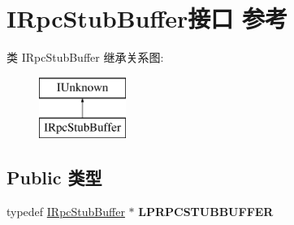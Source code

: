 \hypertarget{interface_i_rpc_stub_buffer}{}\section{I\+Rpc\+Stub\+Buffer接口 参考}
\label{interface_i_rpc_stub_buffer}
类 I\+Rpc\+Stub\+Buffer 继承关系图\+:\begin{figure}[H]
\begin{center}
\leavevmode
\includegraphics[height=2.000000cm]{interface_i_rpc_stub_buffer}
\end{center}
\end{figure}
\subsection*{Public 类型}
\begin{DoxyCompactItemize}
\item 
\mbox{\label{interface_i_rpc_stub_buffer_a7000c0ef8c6b394d604f2b82aa3db4eb}} 
typedef \hyperlink{interface_i_rpc_stub_buffer}{I\+Rpc\+Stub\+Buffer} $\ast$ {\bfseries L\+P\+R\+P\+C\+S\+T\+U\+B\+B\+U\+F\+F\+ER}
\end{DoxyCompactItemize}
